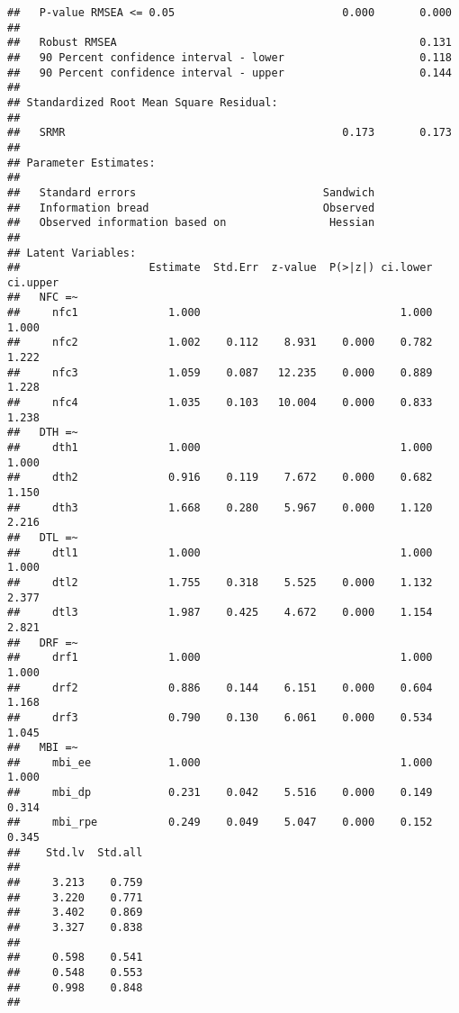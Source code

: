 \documentclass[
  english,
  man]{apa6}
\begin{document}
\begin{verbatim}
##   P-value RMSEA <= 0.05                          0.000       0.000
##                                                                   
##   Robust RMSEA                                               0.131
##   90 Percent confidence interval - lower                     0.118
##   90 Percent confidence interval - upper                     0.144
## 
## Standardized Root Mean Square Residual:
## 
##   SRMR                                           0.173       0.173
## 
## Parameter Estimates:
## 
##   Standard errors                             Sandwich
##   Information bread                           Observed
##   Observed information based on                Hessian
## 
## Latent Variables:
##                    Estimate  Std.Err  z-value  P(>|z|) ci.lower ci.upper
##   NFC =~                                                                
##     nfc1              1.000                               1.000    1.000
##     nfc2              1.002    0.112    8.931    0.000    0.782    1.222
##     nfc3              1.059    0.087   12.235    0.000    0.889    1.228
##     nfc4              1.035    0.103   10.004    0.000    0.833    1.238
##   DTH =~                                                                
##     dth1              1.000                               1.000    1.000
##     dth2              0.916    0.119    7.672    0.000    0.682    1.150
##     dth3              1.668    0.280    5.967    0.000    1.120    2.216
##   DTL =~                                                                
##     dtl1              1.000                               1.000    1.000
##     dtl2              1.755    0.318    5.525    0.000    1.132    2.377
##     dtl3              1.987    0.425    4.672    0.000    1.154    2.821
##   DRF =~                                                                
##     drf1              1.000                               1.000    1.000
##     drf2              0.886    0.144    6.151    0.000    0.604    1.168
##     drf3              0.790    0.130    6.061    0.000    0.534    1.045
##   MBI =~                                                                
##     mbi_ee            1.000                               1.000    1.000
##     mbi_dp            0.231    0.042    5.516    0.000    0.149    0.314
##     mbi_rpe           0.249    0.049    5.047    0.000    0.152    0.345
##    Std.lv  Std.all
##                   
##     3.213    0.759
##     3.220    0.771
##     3.402    0.869
##     3.327    0.838
##                   
##     0.598    0.541
##     0.548    0.553
##     0.998    0.848
##                   

\end{verbatim}
\end{document}
